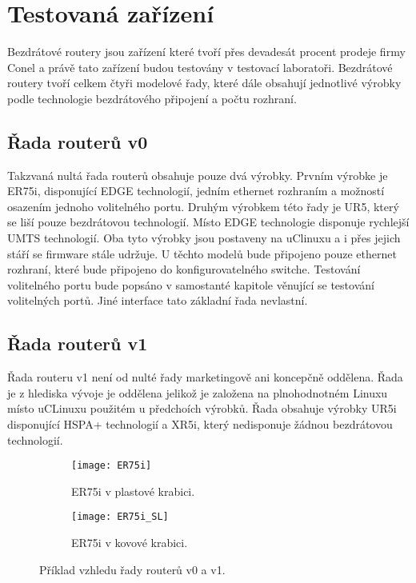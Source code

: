 \section{Testovaná zařízení}
Bezdrátové routery jsou zařízení které tvoří přes devadesát procent prodeje firmy Conel a právě tato zařízení budou testovány v testovací laboratoři. Bezdrátové routery tvoří celkem čtyři modelové řady, které dále obsahují jednotlivé výrobky podle technologie bezdrátového připojení a počtu rozhraní.

\subsection{Řada routerů v0}
Takzvaná nultá řada routerů obsahuje pouze dvá výrobky. Prvním výrobke je ER75i, disponující EDGE technologií, jedním ethernet rozhraním a možností osazením jednoho volitelného portu. Druhým výrobkem této řady je UR5, který se liší pouze bezdrátovou technologií. Místo EDGE technologie disponuje rychlejší UMTS technologií. Oba tyto výrobky jsou postaveny na uClinuxu a i přes jejich stáří se firmware stále udržuje. U těchto modelů bude připojeno pouze ethernet rozhraní, které bude připojeno do konfigurovatelného switche. Testování volitelného portu bude popsáno v samostanté kapitole věnující se testování volitelných portů. Jiné interface tato základní řada nevlastní.

\subsection{Řada routerů v1}
Řada routeru v1 není od nulté řady marketingově ani koncepčně oddělena. Řada je z hlediska vývoje je oddělena jelikož je založena na plnohodnotném Linuxu místo uCLinuxu použitém u předchoích výrobků. Řada obsahuje výrobky UR5i disponující HSPA+ technologií a XR5i, který nedisponuje žádnou bezdrátovou technologií.

\begin{figure}[h]
  \begin{subfigure}[h]{0.5\LW}
    \centering
    \texttt{[image: ER75i]}
    \caption{ER75i v plastové krabici.}
    \label{fig:ER75i}
  \end{subfigure}
  \begin{subfigure}[h]{0.5\LW}
    \centering
    \texttt{[image: ER75i\_SL]}
    \caption{ER75i v kovové krabici.}
    \label{fig:ER75i SL}
  \end{subfigure}
  \caption{Příklad vzhledu řady routerů v0 a v1.}
  \label{fig:ER75i}
\end{figure}


